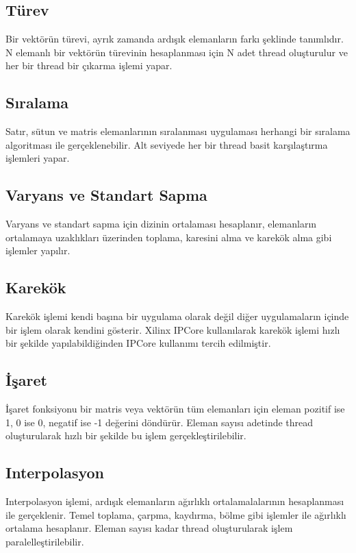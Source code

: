 \subsection{Türev}
Bir vektörün türevi, ayrık zamanda ardışık elemanların farkı şeklinde tanımlıdır. N elemanlı bir vektörün türevinin hesaplanması için N adet thread oluşturulur ve her bir thread bir çıkarma işlemi yapar. 

\subsection{Sıralama}
Satır, sütun ve matris elemanlarının sıralanması uygulaması herhangi bir sıralama algoritması ile gerçeklenebilir. Alt seviyede her bir thread  basit karşılaştırma işlemleri yapar.

\subsection{Varyans ve Standart Sapma}
Varyans ve standart sapma için dizinin ortalaması hesaplanır, elemanların ortalamaya uzaklıkları üzerinden toplama, karesini alma ve karekök alma gibi işlemler yapılır. 

\subsection{Karekök}
Karekök işlemi kendi başına bir uygulama olarak değil diğer uygulamaların içinde bir işlem olarak kendini gösterir. Xilinx IPCore kullanılarak karekök işlemi hızlı bir şekilde yapılabildiğinden IPCore kullanımı tercih edilmiştir.

\subsection{İşaret}
İşaret fonksiyonu bir matris veya vektörün tüm elemanları için eleman pozitif ise 1, 0 ise 0, negatif ise -1 değerini döndürür. Eleman sayısı adetinde thread oluşturularak hızlı bir şekilde bu işlem gerçekleştirilebilir.

\subsection{Interpolasyon}
Interpolasyon işlemi, ardışık elemanların ağırlıklı ortalamalalarının hesaplanması ile gerçeklenir. Temel toplama, çarpma, kaydırma, bölme gibi işlemler ile ağırlıklı ortalama hesaplanır. Eleman sayısı kadar thread oluşturularak işlem paralelleştirilebilir.

